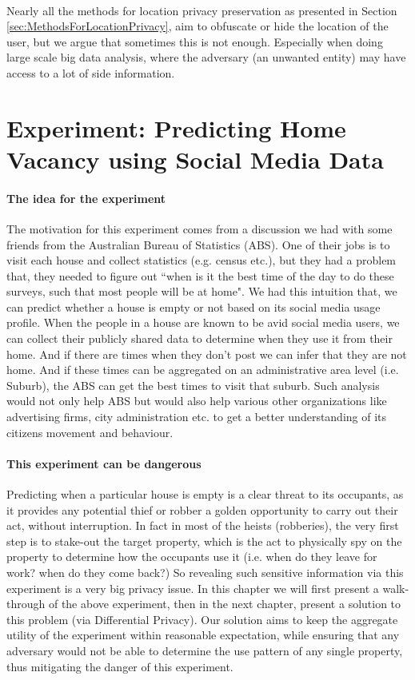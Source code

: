 \documentclass[12pt]{report}
\theoremstyle{named}
\begin{document}
\paragraph{}
Nearly all the methods for location privacy preservation as presented in Section \ref{sec:MethodsForLocationPrivacy}, aim to obfuscate or hide the location of the user, but we argue that sometimes this is not enough. Especially when doing large scale big data analysis, where the adversary (an unwanted entity) may have access to a lot of side information. 

\section{Experiment: Predicting Home Vacancy using Social Media Data}
\paragraph{The idea for the experiment\\}
The motivation for this experiment comes from a discussion we had with some friends from the Australian Bureau of Statistics (ABS). One of their jobs is to visit each house and collect statistics (e.g. census etc.), but they had a problem that, they needed to figure out ``when is it the best time of the day to do these surveys, such that most people will be at home". We had this intuition that, we can predict whether a house is empty or not based on its social media usage profile. When the people in a house are known to be avid social media users, we can collect their publicly shared data to determine when they use it from their home. And if there are times when they don't post we can infer that they are not home. And if these times can be aggregated on an administrative area level (i.e. Suburb), the ABS can get the best times to visit that suburb. Such analysis would not only help ABS but would also help various other organizations like advertising firms, city administration etc. to get a better understanding of its citizens movement and behaviour.
\paragraph{This experiment can be dangerous\\}
Predicting when a particular house is empty is a clear threat to its occupants, as it provides any potential thief or robber a golden opportunity to carry out their act, without interruption. In fact in most of the heists (robberies), the very first step is to stake-out the target property, which is the act to physically spy on  the property to determine how the occupants use it (i.e. when do they leave for work? when do they come back?) So revealing such sensitive information via this experiment is a very big privacy issue. In this chapter we will first present a walk-through of the above experiment, then in the next chapter, present a solution to this problem (via Differential Privacy). Our solution aims to keep the aggregate utility of the experiment within reasonable expectation, while ensuring that any adversary would not be able to determine the use pattern of any single property, thus mitigating the danger of this experiment.
\end{document}
